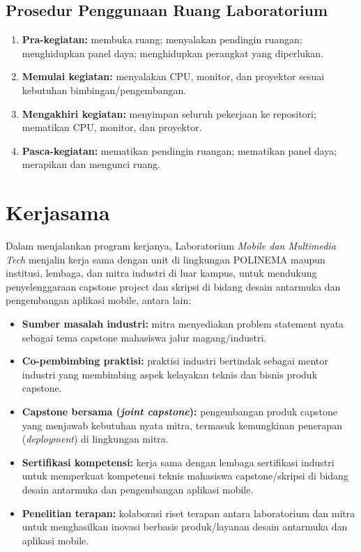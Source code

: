 \documentclass[12pt,a4paper]{report}
\begin{document}
\section{Prosedur Penggunaan Ruang Laboratorium}
\begin{enumerate}
\item \textbf{Pra-kegiatan:} membuka ruang; menyalakan pendingin ruangan; menghidupkan panel daya; menghidupkan perangkat yang diperlukan.
\item \textbf{Memulai kegiatan:} menyalakan CPU, monitor, dan proyektor sesuai kebutuhan bimbingan/pengembangan.
\item \textbf{Mengakhiri kegiatan:} menyimpan seluruh pekerjaan ke repositori; mematikan CPU, monitor, dan proyektor.
\item \textbf{Pasca-kegiatan:} mematikan pendingin ruangan; mematikan panel daya; merapikan dan mengunci ruang.
\end{enumerate}

\chapter{Kerjasama}

Dalam menjalankan program kerjanya, Laboratorium \emph{Mobile dan Multimedia Tech} menjalin kerja sama dengan unit di lingkungan POLINEMA maupun institusi, lembaga, dan mitra industri di luar kampus, untuk mendukung penyelenggaraan capstone project dan skripsi di bidang desain antarmuka dan pengembangan aplikasi mobile, antara lain:
\begin{itemize}
\item \textbf{Sumber masalah industri:} mitra menyediakan problem statement nyata sebagai tema capstone mahasiswa jalur magang/industri.
\item \textbf{Co-pembimbing praktisi:} praktisi industri bertindak sebagai mentor industri yang membimbing aspek kelayakan teknis dan bisnis produk capstone.
\item \textbf{Capstone bersama (\emph{joint capstone}):} pengembangan produk capstone yang menjawab kebutuhan nyata mitra, termasuk kemungkinan penerapan (\emph{deployment}) di lingkungan mitra.
\item \textbf{Sertifikasi kompetensi:} kerja sama dengan lembaga sertifikasi industri untuk memperkuat kompetensi teknis mahasiswa capstone/skripsi di bidang desain antarmuka dan pengembangan aplikasi mobile.
\item \textbf{Penelitian terapan:} kolaborasi riset terapan antara laboratorium dan mitra untuk menghasilkan inovasi berbasis produk/layanan desain antarmuka dan aplikasi mobile.
\end{itemize}

\PedomanPengesahan
\end{document}
